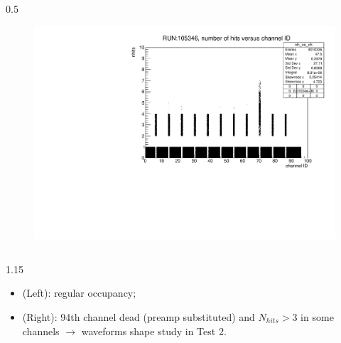 \documentclass{beamer}
\begin{document}
\begin{frame}
\begin{columns}
\begin{column}{0.5\framewidth}
\begin{figure}[!h]
      \centering
      \vspace{-3mm}
      \includegraphics[width=\columnwidth]{figures/pdf/run105346_nh_vs_ch.pdf}
     \label{fig:normalhits}
\end{figure}
 \end{column}
\end{columns}
 \vspace{-6mm}
 \begin{columns}
 \begin{column}{1.15\framewidth}
     \setlength{\leftmargini}{1.1em}
 \begin{itemize}
 \item (Left): regular occupancy;
    \item (Right): 94th channel dead (preamp substituted) and $N_{hits}>3$ in some channels $\rightarrow$ waveforms shape study in Test 2.
    \end{itemize}
     \end{column}
\end{columns}
\end{frame}
\end{document}
